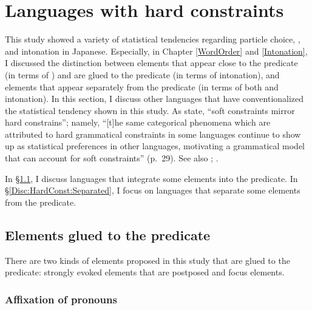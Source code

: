 
\section{Languages with hard constraints}\label{Disc:HardConst}

This study showed a variety of statistical tendencies regarding particle choice, , and intonation in Japanese.
Especially, in Chapter \ref{WordOrder} and \ref{Intonation},
I discussed the distinction between
elements that appear close to the predicate (in terms of ) and are glued to the predicate (in terms of intonation), and
elements that appear separately from the predicate (in terms of both  and intonation).
In this section,
I discuss other languages that have conventionalized the statistical tendency shown in this study.
As  state,
``soft constraints mirror hard constrains'';
namely, ``[t]he same categorical phenomena which are attributed to hard grammatical constraints in some languages continue to show up as statistical preferences in other languages,
motivating a grammatical model that can account for soft constraints'' (p.~29).
See also ; .

In \S \ref{Disc:HardConst:Integrated},
I discuss languages that
integrate some elements into the predicate.
In \S \ref{Disc:HardConst:Separated},
I focus on languages that
separate some elements from the predicate.

\subsection{Elements glued to the predicate}\label{Disc:HardConst:Integrated}

There are two kinds of elements proposed in this study
that are glued to the predicate:
strongly evoked elements that are postposed and
focus elements.

\subsubsection{Affixation of pronouns}

